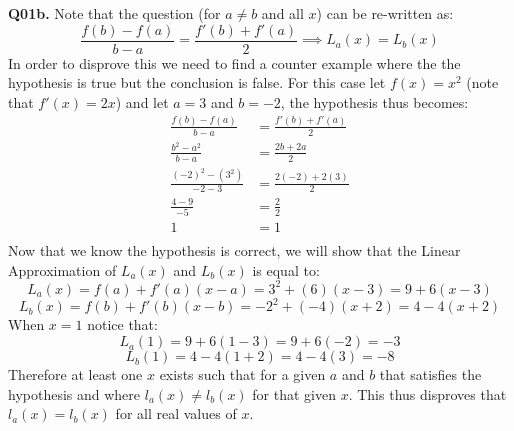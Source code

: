 \documentclass[11pt]{article}
\begin{document}
\textbf{Q01b.} Note that the question (for $a \neq b$ and all $x$) can be re-written as:
\[ \frac{f(b)-f(a)}{b-a} = \frac{f'(b)+f'(a)}{2}  \implies L_a(x) = L_b(x) \]
In order to disprove this we need to find a counter example where the the hypothesis is true but the conclusion is false. For this case let $f(x)=x^2$ (note that $f'(x) = 2x$) and let $a=3$ and $b=-2$, the hypothesis thus becomes:
\begin{align*}
\frac{f(b)-f(a)}{b-a} &= \frac{f'(b)+f'(a)}{2}\\
\frac{b^2-a^2}{b-a} &= \frac{2b+2a}{2}\\
\frac{(-2)^2-(3^2)}{-2-3} &= \frac{2(-2)+2(3)}{2}\\
\frac{4-9}{-5} &= \frac{2}{2}\\
1 &= 1\\
\end{align*}
Now that we know the hypothesis is correct, we will show that the Linear Approximation of $L_a(x)$ and $L_b(x)$ is equal to:
\[ L_a(x) =f(a)+f'(a)(x-a) = 3^2 + (6)(x-3) = 9 + 6(x-3) \]
\[ L_b(x) =f(b)+f'(b)(x-b) = -2^2 + (-4)(x+2) = 4  - 4(x+2) \]
When $x =1$ notice that:
\[ L_a(1) = 9 + 6(1-3) = 9+6(-2) = -3 \]
\[ L_b(1) = 4  - 4(1+2) = 4 - 4(3) = -8 \]
Therefore at least one $x$ exists such that for a given $a$ and $b$ that satisfies the hypothesis and where $l_a(x) \neq l_b(x)$ for that given $x$. This thus disproves that $l_a(x) = l_b(x)$ for all real values of $x$.
\end{document}
